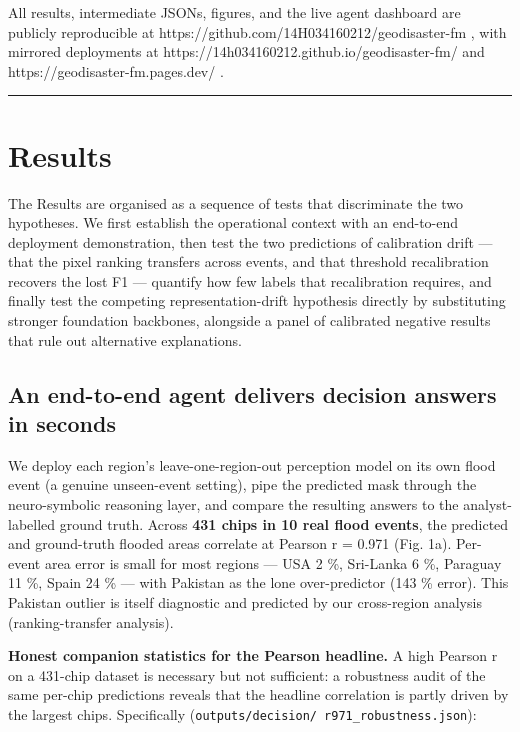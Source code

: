 All results, intermediate JSONs, figures, and the live agent dashboard are
publicly reproducible at https://github.com/14H034160212/geodisaster-fm , with
mirrored deployments at https://14h034160212.github.io/geodisaster-fm/ and
https://geodisaster-fm.pages.dev/ .

\begin{center}\rule{0.5\linewidth}{0.5pt}\end{center}

\section{Results}\label{results}

The Results are organised as a sequence of tests that discriminate the
two hypotheses. We first establish the operational context with an
end-to-end deployment demonstration, then test the two predictions of
calibration drift --- that the pixel ranking transfers across events, and
that threshold recalibration recovers the lost F1 --- quantify how few
labels that recalibration requires, and finally test the competing
representation-drift hypothesis directly by substituting stronger
foundation backbones, alongside a panel of calibrated negative results
that rule out alternative explanations.

\subsection{An end-to-end agent delivers decision answers in seconds}\label{an-end-to-end-agent-delivers-decision-answers-in-seconds}

We deploy each region's leave-one-region-out perception model on its own flood
event (a genuine unseen-event setting), pipe the predicted mask through the
neuro-symbolic reasoning layer, and compare the resulting answers to the
analyst-labelled ground truth. Across \textbf{431 chips in 10 real flood events},
the predicted and ground-truth flooded areas correlate at Pearson r = 0.971
(Fig. 1a). Per-event area error is small for most regions --- USA 2 \%,
Sri-Lanka 6 \%, Paraguay 11 \%, Spain 24 \% --- with Pakistan as the lone
over-predictor (143 \% error). This Pakistan outlier is itself diagnostic and
predicted by our cross-region analysis (ranking-transfer analysis).

\textbf{Honest companion statistics for the Pearson headline.} A high Pearson r
on a 431-chip dataset is necessary but not sufficient: a robustness audit
of the same per-chip predictions reveals that the headline correlation is
partly driven by the largest chips. Specifically (\texttt{outputs/decision/\ r971\_robustness.json}):


